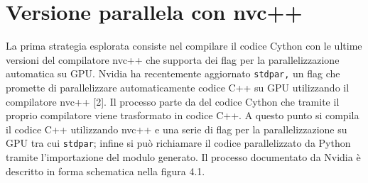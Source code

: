 \documentclass[12pt,a4paper]{report}
\begin{document}
\chapter{Versione parallela con nvc++} 
La prima strategia esplorata consiste nel compilare il codice Cython con le ultime versioni del compilatore nvc++ che supporta dei flag per la parallelizzazione automatica su GPU.  Nvidia ha recentemente aggiornato \verb|stdpar,|  un flag che promette di parallelizzare automaticamente codice C++ su GPU utilizzando il compilatore nvc++ [2]. \newline
Il processo parte da del codice Cython che tramite il proprio compilatore viene trasformato in codice C++.  A questo punto si compila il codice C++ utilizzando nvc++ e una serie di flag per la parallelizzazione su GPU tra cui \verb|stdpar|; infine si può richiamare il codice parallelizzato da Python tramite l'importazione del modulo generato. \newline
Il processo documentato da Nvidia è descritto in forma schematica nella figura 4.1.
\begin{figure}[H]
\centering
\begin{floatrow}[1]
\end{floatrow}
\end{figure} \newpage
\end{document}
